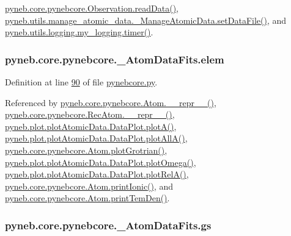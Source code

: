 \hyperlink{pynebcore_8py_source_l03711}{pyneb.\-core.\-pynebcore.\-Observation.\-read\-Data()}, \hyperlink{manage__atomic__data_8py_source_l00380}{pyneb.\-utils.\-manage\-\_\-atomic\-\_\-data.\-\_\-\-Manage\-Atomic\-Data.\-set\-Data\-File()}, and \hyperlink{logging_8py_source_l00115}{pyneb.\-utils.\-logging.\-my\-\_\-logging.\-timer()}.

\hypertarget{classpyneb_1_1core_1_1pynebcore_1_1___atom_data_fits_a4724ac766d9c28d48fdcf43f50bd8478}{
\subsubsection[{elem}]{\setlength{\rightskip}{0pt plus 5cm}pyneb.\-core.\-pynebcore.\-\_\-\-Atom\-Data\-Fits.\-elem}}\label{classpyneb_1_1core_1_1pynebcore_1_1___atom_data_fits_a4724ac766d9c28d48fdcf43f50bd8478}


Definition at line \hyperlink{pynebcore_8py_source_l00090}{90} of file \hyperlink{pynebcore_8py_source}{pynebcore.\-py}.



Referenced by \hyperlink{pynebcore_8py_source_l02615}{pyneb.\-core.\-pynebcore.\-Atom.\-\_\-\-\_\-repr\-\_\-\-\_\-()}, \hyperlink{pynebcore_8py_source_l03154}{pyneb.\-core.\-pynebcore.\-Rec\-Atom.\-\_\-\-\_\-repr\-\_\-\-\_\-()}, \hyperlink{plot_atomic_data_8py_source_l00117}{pyneb.\-plot.\-plot\-Atomic\-Data.\-Data\-Plot.\-plot\-A()}, \hyperlink{plot_atomic_data_8py_source_l00189}{pyneb.\-plot.\-plot\-Atomic\-Data.\-Data\-Plot.\-plot\-All\-A()}, \hyperlink{pynebcore_8py_source_l02443}{pyneb.\-core.\-pynebcore.\-Atom.\-plot\-Grotrian()}, \hyperlink{plot_atomic_data_8py_source_l00373}{pyneb.\-plot.\-plot\-Atomic\-Data.\-Data\-Plot.\-plot\-Omega()}, \hyperlink{plot_atomic_data_8py_source_l00262}{pyneb.\-plot.\-plot\-Atomic\-Data.\-Data\-Plot.\-plot\-Rel\-A()}, \hyperlink{pynebcore_8py_source_l02233}{pyneb.\-core.\-pynebcore.\-Atom.\-print\-Ionic()}, and \hyperlink{pynebcore_8py_source_l02324}{pyneb.\-core.\-pynebcore.\-Atom.\-print\-Tem\-Den()}.

\hypertarget{classpyneb_1_1core_1_1pynebcore_1_1___atom_data_fits_ae8ab3604ecbf05c1f668717fc13e9dc2}{
\subsubsection[{gs}]{\setlength{\rightskip}{0pt plus 5cm}pyneb.\-core.\-pynebcore.\-\_\-\-Atom\-Data\-Fits.\-gs}}\label{classpyneb_1_1core_1_1pynebcore_1_1___atom_data_fits_ae8ab3604ecbf05c1f668717fc13e9dc2}


